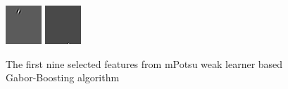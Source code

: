 \begin{figure}[ht]
\begin{center}
  \includegraphics[width=\columnwidth/11]{ch5/figures/8_Scaling_M.png}
  \includegraphics[width=\columnwidth/11]{ch5/figures/9_Scaling_M.png}
  \caption{The first nine selected features from mPotsu weak learner based Gabor-Boosting algorithm}
  \label{fig:10featuresmulti}
 \end{center}
\end{figure} 
